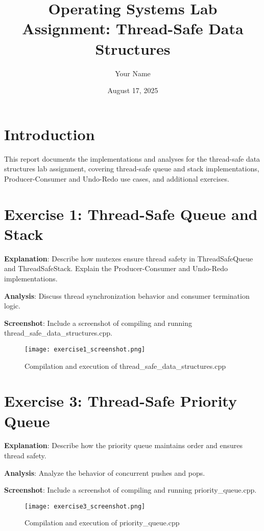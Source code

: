 \documentclass[a4paper,11pt]{article}
\begin{document}
\title{Operating Systems Lab Assignment: Thread-Safe Data Structures}
\author{Your Name}
\date{August 17, 2025}
\maketitle

\section{Introduction}
This report documents the implementations and analyses for the thread-safe data structures lab assignment, covering thread-safe queue and stack implementations, Producer-Consumer and Undo-Redo use cases, and additional exercises.

\section{Exercise 1: Thread-Safe Queue and Stack}

\textbf{Explanation}: Describe how mutexes ensure thread safety in ThreadSafeQueue and ThreadSafeStack. Explain the Producer-Consumer and Undo-Redo implementations.

\textbf{Analysis}: Discuss thread synchronization behavior and consumer termination logic.

\textbf{Screenshot}: Include a screenshot of compiling and running thread_safe_data_structures.cpp.
\begin{figure}[H]
    \centering
    \texttt{[image: exercise1\_screenshot.png]}
    \caption{Compilation and execution of thread_safe_data_structures.cpp}
\end{figure}

\section{Exercise 3: Thread-Safe Priority Queue}

\textbf{Explanation}: Describe how the priority queue maintains order and ensures thread safety.

\textbf{Analysis}: Analyze the behavior of concurrent pushes and pops.

\textbf{Screenshot}: Include a screenshot of compiling and running priority_queue.cpp.
\begin{figure}[H]
    \centering
    \texttt{[image: exercise3\_screenshot.png]}
    \caption{Compilation and execution of priority_queue.cpp}
\end{figure}
\end{document}
